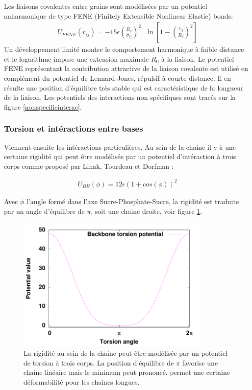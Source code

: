 \documentclass[a4paper,11pt]{article}
\begin{document}
Les liaisons covalentes entre grains sont modélisées par un potentiel anharmonique de type FENE (Finitely Extensible Nonlinear Elastic) bonds:
\begin{eqnarray}
U_{FENE}(r_{ij})= -15\epsilon \left(\frac{R_0}{\sigma_{ij}}\right)^2\text{ } \ln\left[1-\left(\frac{r_{ij}}{R_0}\right)^2\right]
\end{eqnarray}
Un développement limité montre le comportement harmonique à faible distance et le logarithme impose une extension maximale $R_0$ à la liaison. Le potentiel FENE représentant la contribution attractive de la liaison covalente est utilisé en complément du potentiel de Lennard-Jones, répulsif à courte distance. Il en résulte une position d'équilibre très stable qui est caractéristique de la longueur de la liaison. Les potentiels des interactions non spécifiques sont tracés sur la figure \ref{nonspecificinterac}.

\subsubsection*{Torsion et intéractions entre bases}

Viennent ensuite les intéractions particulières. Au sein de la chaine il y à une certaine rigidité qui peut être modélisée par un potentiel d'intéraction à trois corps comme proposé par Linak, Tourdeau et Dorfman \cite{jchem}: 

\begin{eqnarray}
U_{BB}(\phi)= 12\epsilon \left( 1+cos(\phi)\right)^{2}
\end{eqnarray}

Avec $\phi$ l'angle formé dans l'axe Sucre-Phosphate-Sucre, la rigidité est traduite par un angle d'équilibre de $\pi$, soit une chaine droite, voir figure \ref{torsion}.

\begin{figure}[H]
\begin{center}
\includegraphics[width=0.85\textwidth]{backbone.pdf}

\caption{La rigidité au sein de la chaine peut être modélisée par un potentiel de torsion à trois corps. La position d'équilibre de $\pi$ favorise une chaine linéaire mais le minimum peut prononcé, permet une certaine déformabilité pour les chaines longues.}
\label{torsion}
\end{center}
\end{figure}
\end{document}

